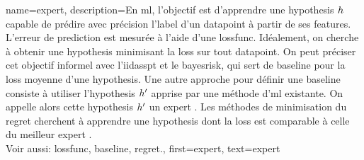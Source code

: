 {
	name={expert},
	description={En \gls{ml}, l'objectif est d'apprendre une \gls{hypothesis} $h$ capable de prédire avec précision l'\gls{label} 
		d'un \gls{datapoint} à partir de ses \glspl{feature}. L'erreur de \gls{prediction} est mesurée à l'aide d'une \gls{lossfunc}. 
		Idéalement, on cherche à obtenir une \gls{hypothesis} minimisant la \gls{loss} sur tout \gls{datapoint}. 
		On peut préciser cet objectif informel avec l'\gls{iidasspt} et le \gls{bayesrisk}, qui sert de \gls{baseline} pour la \gls{loss} moyenne d'une \gls{hypothesis}. 
		Une autre approche pour définir une \gls{baseline} consiste à utiliser l'\gls{hypothesis} $h'$ apprise par une méthode d’\gls{ml} existante. 
		On appelle alors cette \gls{hypothesis} $h'$ un expert \cite{PredictionLearningGames}. 
		Les méthodes de minimisation du \gls{regret} cherchent à apprendre une \gls{hypothesis} dont la \gls{loss} est comparable à celle du meilleur expert \cite{PredictionLearningGames,HazanOCO}.
		\\ 
		Voir aussi: \gls{lossfunc}, \gls{baseline}, \gls{regret}.},
	first={expert},
	text={expert}
}

